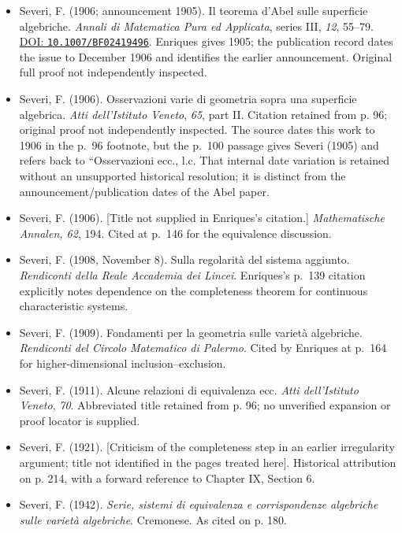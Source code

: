 \begin{sloppypar}
\begin{itemize}
\item Severi, F. (1906; announcement 1905). Il teorema d'Abel sulle superficie algebriche. \emph{Annali di Matematica Pura ed Applicata}, series III, \emph{12}, 55--79. \href{https://doi.org/10.1007/BF02419496}{DOI: \nolinkurl{10.1007/BF02419496}}. Enriques gives 1905; the publication record dates the issue to December 1906 and identifies the earlier announcement. Original full proof not independently inspected.

\item Severi, F. (1906). Osservazioni varie di geometria sopra una superficie algebrica. \emph{Atti dell'Istituto Veneto}, \emph{65}, part II. Citation retained from p. 96; original proof not independently inspected. The source dates this work to 1906 in the p.~96 footnote, but the p.~100 passage gives Severi (1905) and refers back to ``Osservazioni ecc., l.c. That internal date variation is retained without an unsupported historical resolution; it is distinct from the announcement/publication dates of the Abel paper.

\item Severi, F. (1906). {[}Title not supplied in Enriques's citation.{]} \emph{Mathematische Annalen, 62}, 194. Cited at p.~146 for the equivalence discussion.

\item Severi, F. (1908, November 8). Sulla regolarità del sistema aggiunto. \emph{Rendiconti della Reale Accademia dei Lincei}. Enriques's p.~139 citation explicitly notes dependence on the completeness theorem for continuous characteristic systems.

\item Severi, F. (1909). Fondamenti per la geometria sulle varietà algebriche. \emph{Rendiconti del Circolo Matematico di Palermo}. Cited by Enriques at p.~164 for higher-dimensional inclusion--exclusion.

\item Severi, F. (1911). Alcune relazioni di equivalenza ecc. \emph{Atti dell'Istituto Veneto}, \emph{70}. Abbreviated title retained from p. 96; no unverified expansion or proof locator is supplied.

\item Severi, F. (1921). [Criticism of the completeness step in an earlier irregularity argument; title not identified in the pages treated here]. Historical attribution on p. 214, with a forward reference to Chapter IX, Section 6.

\item Severi, F. (1942). \emph{Serie, sistemi di equivalenza e corrispondenze algebriche sulle variet\`a algebriche}. Cremonese. As cited on p. 180.


\end{itemize}
\end{sloppypar}

